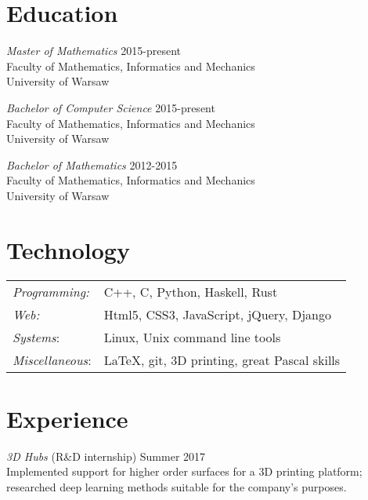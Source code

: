 \documentclass[margin, 10pt]{res} %
\begin{document}
\begin{resume}



\section{Education}

{\sl Master of Mathematics} \hfill 2015-present\\
Faculty of Mathematics, Informatics and Mechanics\\
University of Warsaw

{\sl Bachelor of Computer Science} \hfill 2015-present\\
Faculty of Mathematics, Informatics and Mechanics\\
University of Warsaw

{\sl Bachelor of Mathematics} \hfill 2012-2015\\
Faculty of Mathematics, Informatics and Mechanics\\
University of Warsaw

\section{Technology} 

\begin{tabular}{@{}ll}
\textit{Programming:} & C++, C, Python, Haskell, Rust\\
\textit{Web:}& Html5, CSS3, JavaScript, jQuery, Django\\
\textit{Systems}: & Linux, Unix command line tools\\
\textit{Miscellaneous}: & \LaTeX, git, 3D printing, \tiny{great Pascal skills} 
\end{tabular}
 
 
\section{Experience}
{\sl 3D Hubs} (R\&D internship) \hfill Summer 2017 \\
Implemented support for higher order surfaces for a 3D printing platform; researched deep learning methods suitable for the company's purposes.


\end{resume}
\end{document}
